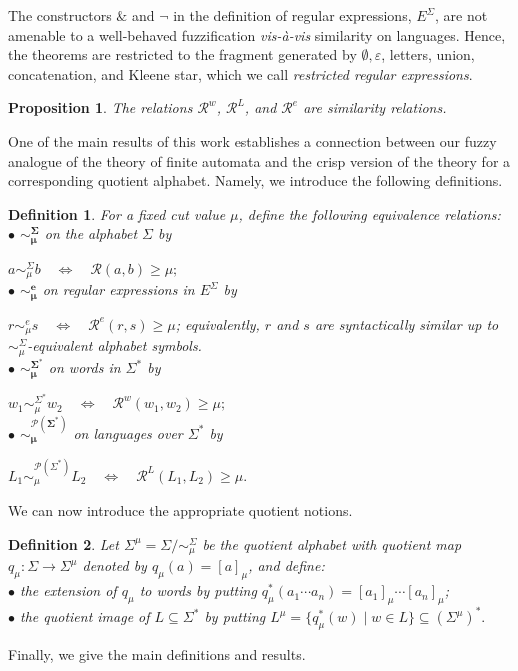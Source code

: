 \documentclass{easychair}
\newtheorem{definition}{Definition}
\newtheorem{proposition}{Proposition}
\begin{document}
The constructors $\&$ and $\neg$ in the definition of regular expressions, $E^\Sigma$, are not amenable to a well-behaved fuzzification {\em vis-à-vis} similarity on languages. Hence, the theorems are restricted to the fragment generated by $\emptyset,\varepsilon$,
letters, union, concatenation, and Kleene star, which we call {\em restricted regular expressions}.

\begin{proposition} The relations $\mathcal R^w$, $\mathcal R^L$, and $\mathcal R^e$ are similarity relations.
\end{proposition}

One of the main results of this work establishes a connection between our fuzzy analogue of the theory of finite automata and the crisp version of the theory for a corresponding quotient alphabet. Namely, we introduce the following definitions.
\begin{definition}For a fixed cut value $\mu$, define the following equivalence relations: \\
$\bullet$ $\boldsymbol{\sim_\mu^\Sigma}$ on the alphabet $\Sigma$ by

$a\sim_\mu^\Sigma b
\quad\Longleftrightarrow\quad
\mathcal R(a,b)\ge\mu;
$
\\
$\bullet$ $\boldsymbol{\sim_\mu^e}$ on regular expressions in $E^\Sigma$ by

$r\sim_\mu^e s
\quad\Longleftrightarrow\quad
\mathcal R^e(r,s)\ge\mu$;
equivalently, $r$ and $s$ are syntactically similar up to $\sim_\mu^\Sigma$-equivalent alphabet symbols.
\\
$\bullet$ $\boldsymbol{\sim_\mu^{\Sigma^\ast}}$ on words in $\Sigma^\ast$ by
 
$w_1\sim_\mu^{\Sigma^\ast} w_2
\quad\Longleftrightarrow\quad
\mathcal R^w(w_1,w_2)\ge\mu;
$\\
$\bullet$ $\boldsymbol{\sim_\mu^{\mathcal P(\Sigma^\ast)}}$ on languages over $\Sigma^\ast$ by

$L_1\sim_\mu^{\mathcal P(\Sigma^\ast)} L_2
\quad\Longleftrightarrow\quad
\mathcal R^L(L_1,L_2)\ge\mu.
$
\end{definition}
We can now introduce the appropriate quotient notions.
\begin{definition}Let
$\Sigma^\mu=\Sigma/{\sim_\mu^\Sigma}$
be the {\em quotient alphabet} with quotient map
$q_\mu:\Sigma\to\Sigma^\mu$ denoted by $q_\mu(a)=[a]_\mu$, and define:\\
$\bullet$ the extension of $q_\mu$ to words by putting $
q_\mu^\ast(a_1\cdots a_n)
=
[a_1]_\mu\cdots[a_n]_\mu
$; \\
$\bullet$ the quotient image of $L\subseteq\Sigma^\ast$ by putting
$ L^\mu=
\{q_\mu^\ast(w)\mid w\in L\}
\subseteq(\Sigma^\mu)^\ast.
$
\end{definition}
Finally, we give the main definitions and results.
\end{document}
